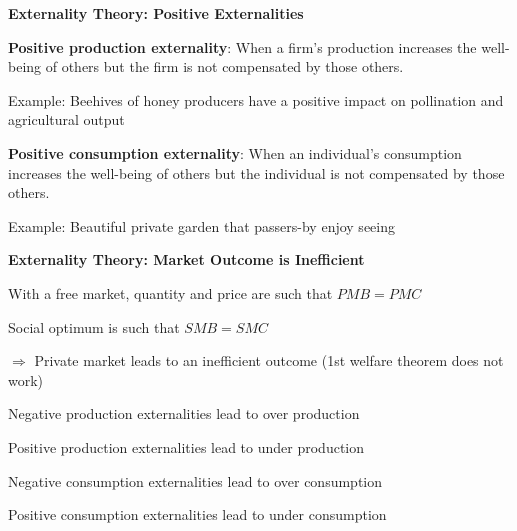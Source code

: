 \documentclass[landscape]{slides}
\begin{document}
\begin{slide}
\begin{center}
{\bf Externality Theory: Positive Externalities}
\end{center}

{\bf Positive production externality}:
When a firm's production increases the well-being of others but the firm is not compensated by those others.

Example: Beehives of honey producers have a positive impact on pollination and agricultural output

{\bf Positive consumption externality}:
When an individual's consumption increases the well-being of others but the individual is not compensated by those others.

Example: Beautiful private garden that passers-by enjoy seeing

\end{slide}

\begin{slide}

\end{slide}


\begin{slide}
\begin{center}
{\bf Externality Theory: Market Outcome is Inefficient}
\end{center}

With a free market, quantity and price are such that $PMB=PMC$

Social optimum is such that $SMB=SMC$

$\Rightarrow$ Private market leads to an inefficient outcome (1st welfare theorem does not work)

Negative production externalities lead to over production

Positive production externalities lead to under production

Negative consumption externalities lead to over consumption

Positive consumption externalities lead to under consumption


\end{slide}
\end{document}
